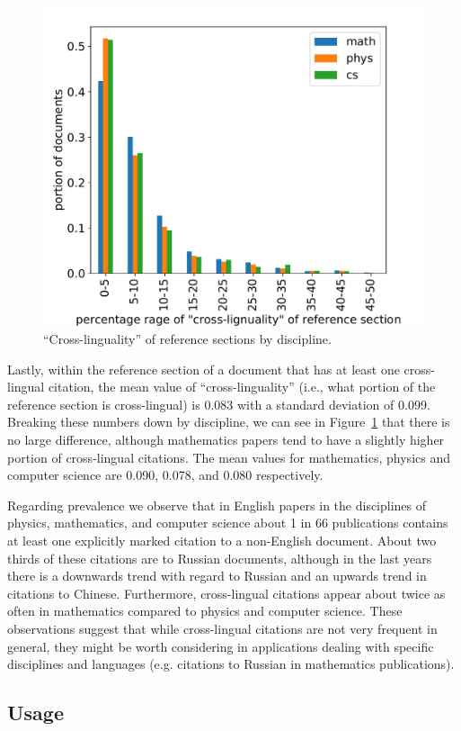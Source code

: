 \begin{figure}[tb]
\centering
\includegraphics[width=0.7\linewidth]{figures/ref_xling/cross_ling_ratio_distribution_lessthan64.pdf}
\caption{``Cross-linguality'' of reference sections by discipline.} \label{fig:xlinglyhistbydisc}
\end{figure}

Lastly, within the reference section of a document that has at least one cross-lingual citation, the mean value of ``cross-linguality'' (i.e., what portion of the reference section is cross-lingual) is 0.083 with a standard deviation of 0.099. Breaking these numbers down by discipline, we can see in Figure~\ref{fig:xlinglyhistbydisc} that there is no large difference, although mathematics papers tend to have a slightly higher portion of cross-lingual citations. The mean values for mathematics, physics and computer science are 0.090, 0.078, and 0.080 respectively.

Regarding prevalence we observe that in English papers in the disciplines of physics, mathematics, and computer science about 1 in 66 publications contains at least one explicitly marked citation to a non-English document. About two thirds of these citations are to Russian documents, although in the last years there is a downwards trend with regard to Russian and an upwards trend in citations to Chinese. Furthermore, cross-lingual citations appear about twice as often in mathematics compared to physics and computer science.
These observations suggest that while cross-lingual citations are not very frequent in general, they might be worth considering in applications dealing with specific disciplines and languages (e.g. citations to Russian in mathematics publications).

\subsection{Usage}
\label{sec:xling-usage}


